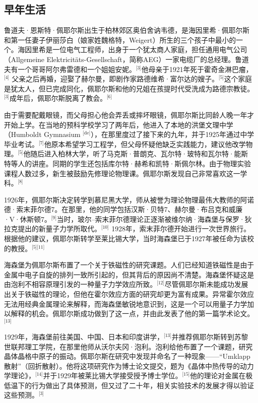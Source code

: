 \subsection{早年生活}
鲁道夫·恩斯特·佩耶尔斯出生于柏林郊区奥伯舍讷韦德，是海因里希·佩耶尔斯和第一任妻子伊丽莎白（娘家姓魏格特，Weigert）所生的三个孩子中最小的一个。海因里希是一位电气工程师，出身于一个犹太商人家庭，担任通用电气公司（Allgemeine Elektricitäts-Gesellschaft，简称AEG）一家电缆厂的总经理。鲁道夫有一个哥哥阿尔弗雷德和一个姐姐安妮。\(^\text{[3]}\)他母亲于1921年死于霍奇金淋巴瘤，\(^\text{[4]}\) 父亲之后再婚，迎娶了赫尔曼，即剧作家路德维希·富尔达的嫂子。\(^\text{[5]}\)这个家庭是犹太人，但已完成同化，佩耶尔斯和他的兄姐在孩提时代受洗成为路德宗教徒。\(^\text{[3]}\)成年后，佩耶尔斯脱离了教会。\(^\text{[6]}\)

由于需要配戴眼镜，而父母担心他会弄丢或摔坏眼镜，佩耶尔斯比同龄人晚一年才开始上学。在当地的预科学校学习了两年后，他进入了本地的洪堡文理中学（Humboldt Gymnasium \(^\text{[de]}\)），在那里度过了接下来的九年，并于1925年通过中学毕业考试。\(^\text{[7]}\)他原本希望学习工程学，但父母怀疑他缺乏实践能力，建议他改学物理。\(^\text{[5]}\)他随后进入柏林大学，听了马克斯·普朗克、瓦尔特·玻特和瓦尔特·能斯特等人的讲座。同期的学生还包括库尔特·赫希和凯特·斯佩尔林。由于物理实验课程人数过多，新生被鼓励先修理论物理课。佩耶尔斯发现自己非常喜欢这一学科。\(^\text{[8]}\)

1926年，佩耶尔斯决定转学到慕尼黑大学，师从被誉为理论物理最伟大教师的阿诺德·索末菲尔德7。在那里，他的同学包括汉斯·贝特7、赫尔曼·布吕克和威廉·V·休斯顿7。\(^\text{[9]}\)当时，玻尔–索末菲尔德理论正逐渐被维尔纳·海森堡与保罗·狄拉克提出的新量子力学所取代。\(^\text{[10]}\) 1928年，索末菲尔德开始进行一次世界旅行。根据他的建议，佩耶尔斯转学至莱比锡大学，当时海森堡已于1927年被任命为该校的教授。\(^\text{[5][11]}\)

海森堡为佩耶尔斯布置了一个关于铁磁性的研究课题。人们已经知道铁磁性是由于金属中电子自旋的排列一致所引起的，但其背后的原因尚不清楚。海森堡怀疑这是由泡利不相容原理引发的一种量子力学效应所致。\(^\text{[12]}\)尽管佩耶尔斯未能成功发展出关于铁磁性的理论，但他在霍尔效应方面的研究却更为富有成果。异常霍尔效应无法用经典金属理论来解释，而海森堡敏锐地意识到，这是一个可以用量子力学加以解释的机会。佩耶尔斯成功做到了这一点，并由此发表了他的第一篇学术论文。\(^\text{[13]}\)

1929年，海森堡前往美国、中国、日本和印度讲学，\(^\text{[13]}\)并推荐佩耶尔斯转到苏黎世联邦理工学院，在那里他师从沃尔夫冈·泡利。泡利给他布置了一个课题，研究晶体晶格中原子的振动。佩耶尔斯在研究中发现并命名了一种现象——“Umklapp 散射”（回折散射）。他将这项研究作为博士论文提交，题为《晶体中热传导的动力学理论》，\(^\text{[14]}\)并于1929年被莱比锡大学接受授予博士学位。\(^\text{[15]}\)他的理论对金属在极低温下的行为做出了具体预测，但又过了二十年，相关实验技术的发展才得以验证这些预测。\(^\text{[3]}\)
